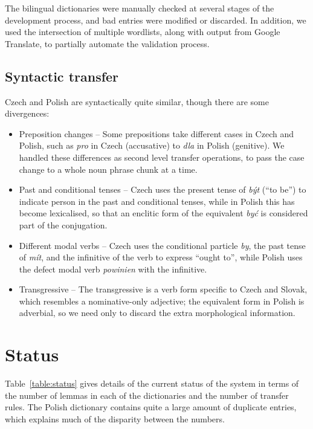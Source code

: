 \documentclass[11pt]{article}
\begin{document}
The bilingual dictionaries were manually checked at several stages of the development 
process, and bad entries were modified or discarded. In addition, we used the intersection
of multiple wordlists, along with output from Google Translate, to partially automate
the validation process.

\subsection{Syntactic transfer}

Czech and Polish are syntactically quite similar, though there are some divergences:

\begin{itemize}
\item Preposition changes -- Some prepositions take different cases in Czech and Polish,
such as \emph{pro} in Czech (accusative) to \emph{dla} in Polish (genitive). We handled
these differences as second level transfer operations, to pass the case change to a whole noun
phrase chunk at a time.
\item Past and conditional tenses -- Czech uses the present tense of \emph{být} (``to be'') to 
indicate person in the past and conditional tenses, while in Polish this has become
lexicalised, so that an enclitic form of the equivalent \emph{być} is considered part
of the conjugation.
\item Different modal verbs -- Czech uses the conditional particle \emph{by}, the past tense
of \emph{mít}, and the infinitive of the verb to express ``ought to'', while Polish uses
the defect modal verb \emph{powinien} with the infinitive.%
\item Transgressive -- The transgressive is a verb form specific to Czech and
Slovak, which resembles a nominative-only adjective; the equivalent form in Polish is
adverbial, so we need only to discard the extra morphological information.
\end{itemize}

\section{Status}

Table~\ref{table:status} gives details of the current status of the system
in terms of the number of lemmas in each of the dictionaries and the number 
of transfer rules. The Polish dictionary contains quite a large amount of
duplicate entries, which explains much of the disparity between the numbers.
\end{document}
